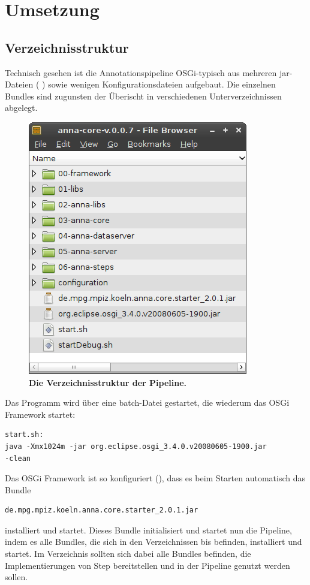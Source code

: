 \chapter{Umsetzung}
\todo{\dots}





\section{Verzeichnisstruktur}
Technisch gesehen ist die Annotationspipeline OSGi-typisch aus
mehreren jar-Dateien ( ) sowie wenigen
Konfigurationsdateien aufgebaut.
Die einzelnen Bundles sind zugunsten der Überischt in verschiedenen
Unterverzeichnissen abgelegt.


\begin{figure}[htbp]
	\begin{center}
		\includegraphics[scale=0.7]{pics/coreDir.png}
	\caption[Verzeichnisstruktur]{
	\textbf{Die Verzeichnisstruktur der Pipeline.}
	}
	\end{center}
	\label{fig:coreDir}
\end{figure}

Das Programm wird über eine batch-Datei gestartet,
die wiederum das OSGi Framework startet:
\begin{verbatim}
start.sh:
java -Xmx1024m -jar org.eclipse.osgi_3.4.0.v20080605-1900.jar
-clean\end{verbatim}
Das OSGi Framework ist so konfiguriert (), dass
es beim Starten automatisch das Bundle
\begin{verbatim}
de.mpg.mpiz.koeln.anna.core.starter_2.0.1.jar
\end{verbatim}
installiert und startet.
Dieses Bundle initialisiert und startet nun die Pipeline, indem es alle Bundles,
die sich in den Verzeichnissen  bis  befinden,
installiert und startet.
Im Verzeichnis  sollten sich dabei alle
Bundles befinden, die Implementierungen von Step bereitstellen und in der
Pipeline genutzt werden sollen.

